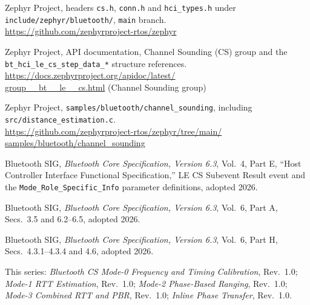 \documentclass[11pt,a4paper]{article}
\newcommand{\code}[1]{\texttt{\small #1}}
\begin{document}
\begin{enumerate}[label={[\arabic*]},leftmargin=2.2em,itemsep=3pt]
\item Zephyr Project, headers \code{cs.h}, \code{conn.h} and
  \code{hci\_\allowbreak{}types.h} under \code{include/zephyr/bluetooth/}, \code{main} branch.\\
  {\small\url{https://github.com/zephyrproject-rtos/zephyr}}

\item Zephyr Project, API documentation, Channel Sounding (CS) group and the
  \code{bt\_\allowbreak{}hci\_\allowbreak{}le\_\allowbreak{}cs\_\allowbreak{}step\_\allowbreak{}data\_\allowbreak{}*} structure references.\\
  {\small\sloppy\url{https://docs.zephyrproject.org/apidoc/latest/}\\
  \url{group__bt__le__cs.html} (Channel Sounding group)}

\item Zephyr Project, \code{samples/bluetooth/channel\_\allowbreak{}sounding}, including
  \code{src/distance\_\allowbreak{}estimation.c}.\\
  {\small\url{https://github.com/zephyrproject-rtos/zephyr/tree/main/}\\
  \url{samples/bluetooth/channel_sounding}}

\item Bluetooth SIG, \emph{Bluetooth Core Specification, Version 6.3}, Vol.\ 4, Part E,
  ``Host Controller Interface Functional Specification,'' LE CS Subevent Result event and the
  \code{Mode\_\allowbreak{}Role\_\allowbreak{}Specific\_\allowbreak{}Info} parameter definitions, adopted 2026.

\item Bluetooth SIG, \emph{Bluetooth Core Specification, Version 6.3}, Vol.\ 6, Part A,
  Secs.\ 3.5 and 6.2--6.5, adopted 2026.

\item Bluetooth SIG, \emph{Bluetooth Core Specification, Version 6.3}, Vol.\ 6, Part H,
  Secs.\ 4.3.1--4.3.4 and 4.6, adopted 2026.

\item This series: \emph{Bluetooth CS Mode-0 Frequency and Timing Calibration}, Rev.\ 1.0;
  \emph{Mode-1 RTT Estimation}, Rev.\ 1.0; \emph{Mode-2 Phase-Based Ranging}, Rev.\ 1.0;
  \emph{Mode-3 Combined RTT and PBR}, Rev.\ 1.0; \emph{Inline Phase Transfer}, Rev.\ 1.0.
\end{enumerate}
\end{document}
